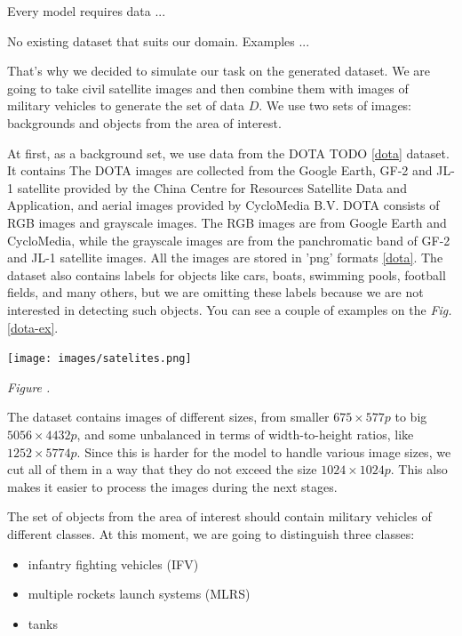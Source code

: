 \documentclass[14pt,a4paper]{extarticle}
\newcounter{e}
\newcounter{pic}
\newcommand{\pic}[1]{\refstepcounter{pic} \vspace{-0.3cm}\textit{Figure \arabic{pic}\label{#1}.}}
\numberwithin{equation}{section}
\numberwithin{figure}{section}
\begin{document}
Every model requires data ...

No existing dataset that suits our domain.
Examples ...

That's why we decided to simulate our task on the generated dataset. We are going to take civil satellite images and then combine them with images of military vehicles to generate the set of data $D$. We use two sets of images: backgrounds and objects from the area of interest.

At first, as a background set, we use data from the DOTA TODO \ref{dota} dataset. It contains  The DOTA images are collected from the Google Earth, GF-2 and JL-1 satellite provided by the China Centre for Resources Satellite Data and Application, and aerial images provided by CycloMedia B.V. DOTA consists of RGB images and grayscale images. The RGB images are from Google Earth and CycloMedia, while the grayscale images are from the panchromatic band of GF-2 and JL-1 satellite images. All the images are stored in 'png' formats \ref{dota}. The dataset also contains labels for objects like cars, boats, swimming pools, football fields, and many others, but we are omitting these labels because we are not interested in detecting such objects. You can see a couple of examples on the \textit{Fig.} \ref{dota-ex}.

\begin{center}
    \texttt{[image: images/satelites.png]}
\end{center}
\begin{center}
    \pic{dota-ex}
\end{center}

The dataset contains images of different sizes, from smaller $675 \times 577p$  to big $5056 \times 4432p$, and some unbalanced in terms of width-to-height ratios, like $1252 \times 5774p$. Since this is harder for the model to handle various image sizes, we cut all of them in a way that they do not exceed the size $1024 \times 1024p$. This also makes it easier to process the images during the next stages.

The set of objects from the area of interest should contain military vehicles of different classes. At this moment, we are going to distinguish three classes:
\begin{itemize}
    \item infantry fighting vehicles (IFV)
    \item multiple rockets launch systems (MLRS) 
    \item tanks
\end{itemize}
\end{document}
